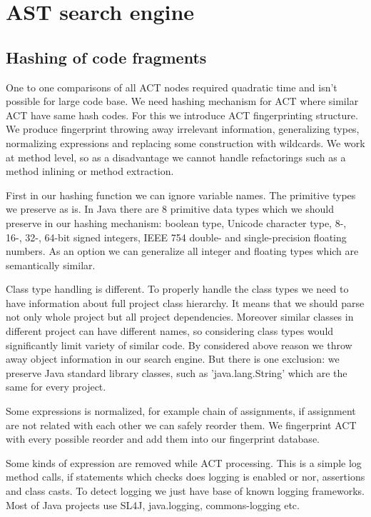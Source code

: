 \section{AST search engine}

\subsection{Hashing of code fragments}

One to one comparisons of all ACT nodes required quadratic time and isn't possible for large code base.
We need hashing mechanism for ACT where similar ACT have same hash codes. For this we
introduce ACT fingerprinting structure. We produce fingerprint throwing away irrelevant 
information, generalizing types, normalizing expressions and replacing some construction with
 wildcards. We work at method level, so as a disadvantage we cannot handle
refactorings such as a method inlining or method extraction.

First in our hashing function we can ignore variable names. The primitive types
we preserve as is. In Java there are 8 primitive data types which we should
preserve in our hashing mechanism: boolean type, Unicode character type, 8-,
16-, 32-, 64-bit signed integers, IEEE 754 double- and single-precision floating numbers. As an option
we can generalize all integer and floating types which are semantically similar.

Class type handling is different. To properly handle the class types we need to
have information about full project class hierarchy. It means that we should parse not
only whole project but all project dependencies. Moreover similar classes in
different project can have different names, so considering class types would
significantly limit variety of similar code. By considered above reason we throw
away object information in our search engine. But there is one exclusion: we
preserve Java standard library classes, such as 'java.lang.String' which are the
same for every project.

Some expressions is normalized, for example chain of assignments, if assignment
are not related with each other we can safely reorder them. We fingerprint ACT with
every possible reorder and add them into our fingerprint database.

Some kinds of expression are removed while ACT processing. This is a simple
log method calls, if statements which checks does logging is enabled or nor,
assertions and class casts. To detect logging we just have base of known logging
frameworks. Most of Java projects use SL4J, java.logging, commons-logging etc.


